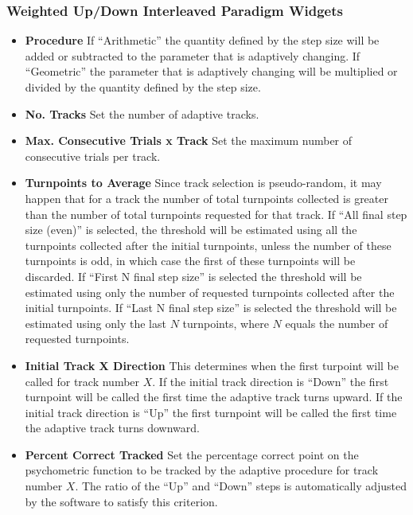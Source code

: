 \documentclass[a4paper,12pt,english]{sphinxmanual}
\begin{document}
\subsubsection{Weighted Up/Down Interleaved Paradigm Widgets}
\label{graphical_user_interface:weighted-up-down-interleaved-paradigm-widgets}\begin{itemize}
\item {} 
\textbf{Procedure} If “Arithmetic” the quantity defined by the step size
will be added or subtracted to the parameter that is adaptively
changing. If “Geometric” the parameter that is adaptively changing
will be multiplied or divided by the quantity defined by the step
size.

\item {} 
\textbf{No. Tracks} Set the number of adaptive tracks.

\item {} 
\textbf{Max. Consecutive Trials x Track} Set the maximum number of
consecutive trials per track.

\item {} 
\textbf{Turnpoints to Average} Since track selection is pseudo-random, it
may happen that for a track the number of total turnpoints collected
is greater than the number of total turnpoints requested for that
track. If “All final step size (even)” is selected, the threshold
will be estimated using all the turnpoints collected after the
initial turnpoints, unless the number of these turnpoints is odd, in
which case the first of these turnpoints will be discarded. If “First
N final step size” is selected the threshold will be estimated using
only the number of requested turnpoints collected after the initial
turnpoints. If “Last N final step size” is selected the threshold
will be estimated using only the last $N$ turnpoints, where
$N$ equals the number of requested turnpoints.

\item {} 
\textbf{Initial Track X Direction} This determines when the first turpoint
will be called for track number $X$. If the initial track
direction is “Down” the first turnpoint will be called the first time
the adaptive track turns upward. If the initial track direction is
“Up” the first turnpoint will be called the first time the adaptive
track turns downward.

\item {} 
\textbf{Percent Correct Tracked} Set the percentage correct point on the
psychometric function to be tracked by the adaptive procedure for
track number $X$. The ratio of the “Up” and “Down” steps is
automatically adjusted by the software to satisfy this criterion.


\end{itemize}
\end{document}

